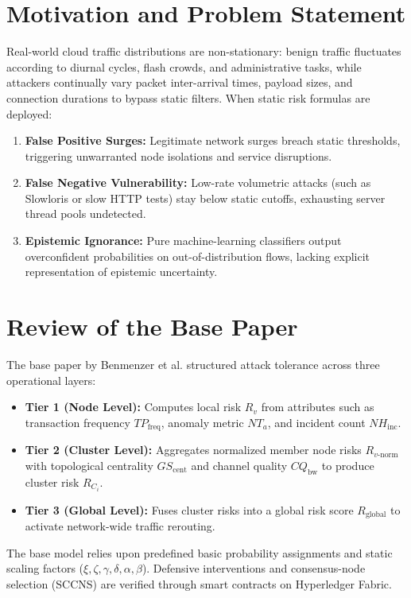 \documentclass[conference]{IEEEtran}
\begin{document}
\section{Motivation and Problem Statement}
Real-world cloud traffic distributions are non-stationary: benign traffic fluctuates according to diurnal cycles, flash crowds, and administrative tasks, while attackers continually vary packet inter-arrival times, payload sizes, and connection durations to bypass static filters. When static risk formulas are deployed:
\begin{enumerate}
    \item \textbf{False Positive Surges:} Legitimate network surges breach static thresholds, triggering unwarranted node isolations and service disruptions.
    \item \textbf{False Negative Vulnerability:} Low-rate volumetric attacks (such as Slowloris or slow HTTP tests) stay below static cutoffs, exhausting server thread pools undetected.
    \item \textbf{Epistemic Ignorance:} Pure machine-learning classifiers output overconfident probabilities on out-of-distribution flows, lacking explicit representation of epistemic uncertainty.
\end{enumerate}

\section{Review of the Base Paper}
The base paper by Benmenzer et al. \cite{benmenzer2025reinforcing} structured attack tolerance across three operational layers:
\begin{itemize}
    \item \textbf{Tier 1 (Node Level):} Computes local risk $R_v$ from attributes such as transaction frequency $TP_{\text{freq}}$, anomaly metric $NT_a$, and incident count $NH_{\text{inc}}$.
    \item \textbf{Tier 2 (Cluster Level):} Aggregates normalized member node risks $R_{v\text{-norm}}$ with topological centrality $GS_{\text{cent}}$ and channel quality $CQ_{\text{bw}}$ to produce cluster risk $R_{C_i}$.
    \item \textbf{Tier 3 (Global Level):} Fuses cluster risks into a global risk score $R_{\text{global}}$ to activate network-wide traffic rerouting.
\end{itemize}
The base model relies upon predefined basic probability assignments and static scaling factors ($\xi, \zeta, \gamma, \delta, \alpha, \beta$). Defensive interventions and consensus-node selection (SCCNS) are verified through smart contracts on Hyperledger Fabric.
\end{document}
